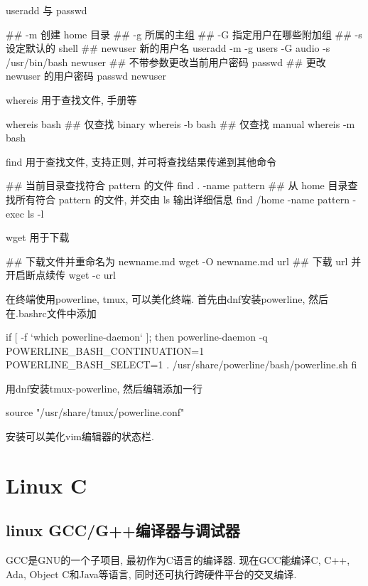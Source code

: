 useradd 与 passwd
\begin{shell}
## -m 创建 home 目录
## -g 所属的主组
## -G 指定用户在哪些附加组
## -s 设定默认的 shell
## newuser 新的用户名
useradd -m -g users -G audio -s /usr/bin/bash newuser
## 不带参数更改当前用户密码
passwd
## 更改 newuser 的用户密码
passwd newuser
\end{shell}

whereis 用于查找文件, 手册等
\begin{shell}
whereis bash
## 仅查找 binary
whereis -b bash
## 仅查找 manual
whereis -m bash
\end{shell}

find 用于查找文件, 支持正则, 并可将查找结果传递到其他命令
\begin{shell}
## 当前目录查找符合 pattern 的文件
find . -name pattern
## 从 home 目录查找所有符合 pattern 的文件, 并交由 ls 输出详细信息
find /home -name pattern -exec ls -l {} \;
\end{shell}

wget 用于下载
\begin{shell}
## 下载文件并重命名为 newname.md
wget -O newname.md url
## 下载 url 并开启断点续传
wget -c url
\end{shell}


在终端使用powerline, tmux, 可以美化终端. 首先由dnf安装powerline, 
然后在.bashrc文件中添加
\begin{shell}
if [ -f `which powerline-daemon` ]; then
  powerline-daemon -q
  POWERLINE_BASH_CONTINUATION=1
  POWERLINE_BASH_SELECT=1
  . /usr/share/powerline/bash/powerline.sh
fi
\end{shell}
用dnf安装tmux-powerline, 然后编辑添加一行
\begin{shell}
 source "/usr/share/tmux/powerline.conf"
\end{shell}

安装可以美化vim编辑器的状态栏.

\section{Linux C}


\subsection{linux GCC/G++编译器与调试器}
GCC是GNU的一个子项目, 最初作为C语言的编译器. 现在GCC能编译C, 
C++, Ada, Object C和Java等语言, 同时还可执行跨硬件平台的交叉编译.

